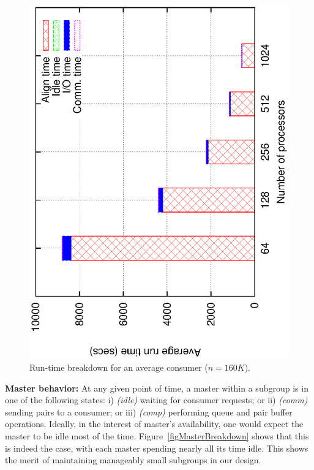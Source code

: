 \documentclass[10pt,journal,letterpaper,compsoc]{IEEEtran}
\begin{document}
\begin{figure}[thb]
\centerline{
						\includegraphics[angle=-90, scale=0.5]{csBreak.eps}
            }
\caption{
Run-time breakdown for an average consumer ($n=160K$).
}
\label{figConsumerBreakdown}
\end{figure}

{\bf Master behavior:} At any given point of time, a master within a subgroup is in one of the following states: i) \emph{(idle)} waiting for consumer requests; or ii) \emph{(comm)} sending pairs to a consumer; or iii) \emph{(comp)} performing queue and pair buffer operations. Ideally, in the interest of master's availability, one would expect the master to be idle most of the time. Figure~\ref{figMasterBreakdown} shows that this is indeed the case, with each master spending nearly all its time idle. This shows the merit of maintaining manageably small subgroups in our design. 
\end{document}
